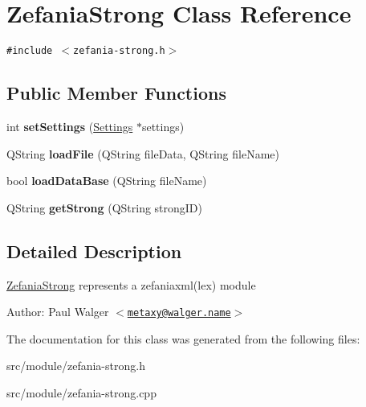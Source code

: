 \hypertarget{classZefaniaStrong}{
\section{ZefaniaStrong Class Reference}
\label{classZefaniaStrong}
}
{\tt \#include $<$zefania-strong.h$>$}

\subsection*{Public Member Functions}
\begin{CompactItemize}
\item 
\hypertarget{classZefaniaStrong_dc1169ad89f6b98338df0dab77003312}{
int \textbf{setSettings} (\hyperlink{classSettings}{Settings} $\ast$settings)}
\label{classZefaniaStrong_dc1169ad89f6b98338df0dab77003312}

\item 
\hypertarget{classZefaniaStrong_ff50283c4e68f6d6760609b0d42a8c2c}{
QString \textbf{loadFile} (QString fileData, QString fileName)}
\label{classZefaniaStrong_ff50283c4e68f6d6760609b0d42a8c2c}

\item 
\hypertarget{classZefaniaStrong_ed2e5d60535ea142164ac03f0f2309c4}{
bool \textbf{loadDataBase} (QString fileName)}
\label{classZefaniaStrong_ed2e5d60535ea142164ac03f0f2309c4}

\item 
\hypertarget{classZefaniaStrong_30c0077f7320e33e50890dce8c72af99}{
QString \textbf{getStrong} (QString strongID)}
\label{classZefaniaStrong_30c0077f7320e33e50890dce8c72af99}

\end{CompactItemize}


\subsection{Detailed Description}
\hyperlink{classZefaniaStrong}{ZefaniaStrong} represents a zefaniaxml(lex) module

\begin{Desc}
\item[Author:]Paul Walger $<$\href{mailto:metaxy@walger.name}{\tt metaxy@walger.name}$>$ \end{Desc}


The documentation for this class was generated from the following files:\begin{CompactItemize}
\item 
src/module/zefania-strong.h\item 
src/module/zefania-strong.cpp\end{CompactItemize}
